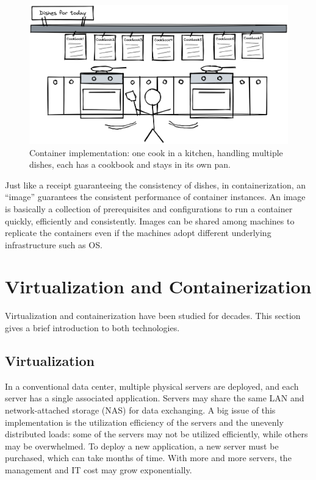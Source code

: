 \begin{figure}[htbp]
	\centering
	\includegraphics[width=350pt]{chapters/ch-virtualization-and-containerization/figures/multitaskcook.png}
	\caption{Container implementation: one cook in a kitchen, handling multiple dishes, each has a cookbook and stays in its own pan.} \label{ch:vac:fig:multitaskcook}
\end{figure}

Just like a receipt guaranteeing the consistency of dishes, in containerization, an ``image'' guarantees the consistent performance of container instances. An image is basically a collection of prerequisites and configurations to run a container quickly, efficiently and consistently. Images can be shared among machines to replicate the containers even if the machines adopt different underlying infrastructure such as OS.

\section{Virtualization and Containerization}

Virtualization and containerization have been studied for decades. This section gives a brief introduction to both technologies.

\subsection{Virtualization}

In a conventional data center, multiple physical servers are deployed, and each server has a single associated application. Servers may share the same LAN and network-attached storage (NAS) for data exchanging. A big issue of this implementation is the utilization efficiency of the servers and the unevenly distributed loads: some of the servers may not be utilized efficiently, while others may be overwhelmed. To deploy a new application, a new server must be purchased, which can take months of time. With more and more servers, the management and IT cost may grow exponentially.

